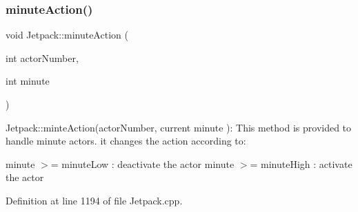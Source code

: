 \mbox{\label{class_jetpack_a97da41141c7b53ddee61143519c8d17d}} 
\subsubsection{\texorpdfstring{minute\+Action()}{minuteAction()}}
{\footnotesize\ttfamily void Jetpack\+::minute\+Action (\begin{DoxyParamCaption}\item[{int}]{actor\+Number,  }\item[{int}]{minute }\end{DoxyParamCaption})}

Jetpack\+::minte\+Action(actor\+Number, current minute )\+: This method is provided to handle minute actors. it changes the action according to\+:

minute $>$= minute\+Low \+: deactivate the actor minute $>$= minute\+High \+: activate the actor 

Definition at line 1194 of file Jetpack.\+cpp.


